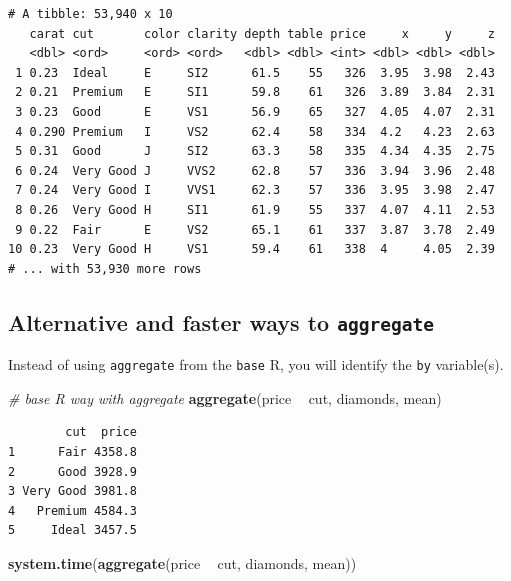 \documentclass[
]{book}
\newenvironment{Shaded}{\begin{snugshade}}{\end{snugshade}}
\newcommand{\CommentTok}[1]{\textcolor[rgb]{0.56,0.35,0.01}{\textit{#1}}}
\newcommand{\KeywordTok}[1]{\textcolor[rgb]{0.13,0.29,0.53}{\textbf{#1}}}
\newcommand{\NormalTok}[1]{#1}
\newcommand{\OperatorTok}[1]{\textcolor[rgb]{0.81,0.36,0.00}{\textbf{#1}}}
\newcommand{\StringTok}[1]{\textcolor[rgb]{0.31,0.60,0.02}{#1}}
\begin{document}
\begin{verbatim}
# A tibble: 53,940 x 10
   carat cut       color clarity depth table price     x     y     z
   <dbl> <ord>     <ord> <ord>   <dbl> <dbl> <int> <dbl> <dbl> <dbl>
 1 0.23  Ideal     E     SI2      61.5    55   326  3.95  3.98  2.43
 2 0.21  Premium   E     SI1      59.8    61   326  3.89  3.84  2.31
 3 0.23  Good      E     VS1      56.9    65   327  4.05  4.07  2.31
 4 0.290 Premium   I     VS2      62.4    58   334  4.2   4.23  2.63
 5 0.31  Good      J     SI2      63.3    58   335  4.34  4.35  2.75
 6 0.24  Very Good J     VVS2     62.8    57   336  3.94  3.96  2.48
 7 0.24  Very Good I     VVS1     62.3    57   336  3.95  3.98  2.47
 8 0.26  Very Good H     SI1      61.9    55   337  4.07  4.11  2.53
 9 0.22  Fair      E     VS2      65.1    61   337  3.87  3.78  2.49
10 0.23  Very Good H     VS1      59.4    61   338  4     4.05  2.39
# ... with 53,930 more rows
\end{verbatim}

\hypertarget{alternative-and-faster-ways-to-aggregate}{%
\subsection{\texorpdfstring{Alternative and faster ways to \texttt{aggregate}}{Alternative and faster ways to aggregate}}\label{alternative-and-faster-ways-to-aggregate}}

Instead of using \texttt{aggregate} from the \texttt{base} R, you will identify the \texttt{by} variable(s).

\begin{Shaded}
\begin{Highlighting}[]
\CommentTok{# base R way with aggregate}
\KeywordTok{aggregate}\NormalTok{(price }\OperatorTok{~}\StringTok{ }\NormalTok{cut, diamonds, mean)}
\end{Highlighting}
\end{Shaded}

\begin{verbatim}
        cut  price
1      Fair 4358.8
2      Good 3928.9
3 Very Good 3981.8
4   Premium 4584.3
5     Ideal 3457.5
\end{verbatim}

\begin{Shaded}
\begin{Highlighting}[]
\KeywordTok{system.time}\NormalTok{(}\KeywordTok{aggregate}\NormalTok{(price }\OperatorTok{~}\StringTok{ }\NormalTok{cut, diamonds, mean))}
\end{Highlighting}
\end{Shaded}
\end{document}
